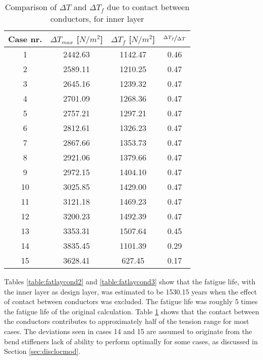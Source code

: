 \begin{table} [H]
\centering
\begin{tabular}{ |c|c|c|c|}
\hline
    Case nr.  & $\Delta T_{max}$ [$N/m^2$] & $\Delta T_f$ [$N/m^2$] & $\nicefrac{\Delta T_f}{\Delta T}$ \\ 
 \hline
 \hline
    1 & 2442.63 & 1142.47 & 0.46  \\ 
    2 & 2589.11 & 1210.25 & 0.47   \\ 
    3 & 2645.16 & 1239.32 & 0.47   \\ 
    4 & 2701.09 & 1268.36 & 0.47   \\
    5 & 2757.21 & 1297.21 & 0.47   \\ 
    6 & 2812.61 & 1326.23 & 0.47  \\ 
    7 & 2867.66 & 1353.73 & 0.47   \\ 
    8 & 2921.06 & 1379.66 & 0.47  \\ 
    9 & 2972.15 & 1404.10 & 0.47  \\ 
    10 & 3025.85 & 1429.00 & 0.47   \\ 
    11 & 3121.18 & 1469.23 & 0.47   \\ 
    12 & 3200.23 & 1492.39 & 0.47  \\ 
    13 & 3353.31 & 1507.64 & 0.45   \\ 
    14 & 3835.45 & 1101.39 & 0.29   \\ 
    15 & 3628.41 & 627.45 & 0.17   \\ 
\hline
\end{tabular}
\caption{Comparison of $\Delta T$ and $\Delta T_f$ due to contact between conductors, for inner layer}
\label{table:tensfri}
\end{table}

Tables \ref{table:fatlaycond2} and \ref{table:fatlaycond3} show that the fatigue life, with the inner layer as design layer, was estimated to be 1530.15 years when the effect of contact between conductors was excluded. The fatigue life was roughly 5 times the fatigue life of the original calculation. Table \ref{table:tensfri} shows that the contact between the conductors contributes to approximately half of the tension range for most cases. The deviations seen in cases 14 and 15 are assumed to originate from the bend stiffeners lack of ability to perform optimally for some cases, as discussed in Section \ref{sec:disclocmod}. 

